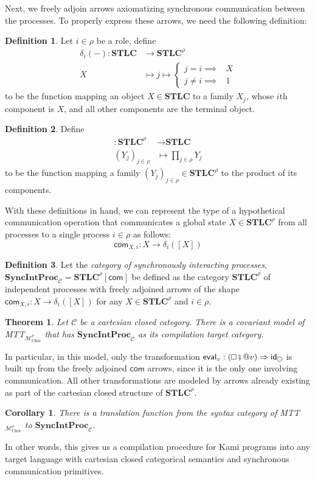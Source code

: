 \documentclass{scrartcl}
\theoremstyle{definition}
\newtheorem{definition}{Definition}
\theoremstyle{plain}
\newtheorem{theorem}{Theorem}
\newtheorem{corollary}{Corollary}
\renewcommand{\square}%
  {\tikz{\draw (0,0) rectangle (0.2cm,0.2cm);}}
\renewcommand{\circle}%
  {\tikz{\draw (0,0) circle [radius=0.1cm];}}
\begin{document}
Next, we freely adjoin arrows axiomatizing synchronous communication between
the processes. To properly express these arrows, we need the following
definition:
\begin{definition}
  Let $i\in\rho$ be a role, define
  \begin{align*}
    \delta_i({-}) : \textbf{STLC} &\to \textbf{STLC}^\rho \\
    X &\mapsto j \mapsto
    \begin{cases}
      j = i \implies &X\\
      j \neq i \implies &1
    \end{cases}
  \end{align*}
  to be the function mapping an object $X \in \textbf{STLC}$ to a family
  $X_j$, whose $i$th component is $X$, and all other components are the
  terminal object.
\end{definition}
\begin{definition} Define
  \begin{align*}
    [{-}] : \textbf{STLC}^\rho &\to \textbf{STLC} \\
    (Y_j)_{j\in\rho} &\mapsto \prod_{j \in \rho} Y_j
  \end{align*}
  to be the function mapping a family $(Y_j)_{j\in\rho} \in \textbf{STLC}^\rho$
  to the product of its components.
\end{definition}
With these definitions in hand, we can represent the type of a hypothetical
communication operation that communicates a global state $X \in
\textbf{STLC}^\rho$ from all processes to a single process $i \in \rho$ as
follows:
\[
  \textsf{com}_{X,i} : X \to \delta_i([X])
\]
\begin{definition}
  Let the \emph{category of synchronously interacting processes},
  $\textbf{SyncIntProc}_{\mathcal{C}} = \textbf{STLC}^\rho[\textsf{com}]$ be
  defined as the category $\textbf{STLC}^\rho$ of independent processes with
  freely adjoined arrows of the shape $\textsf{com}_{X,i} : X \to
  \delta_i([X])$ for any $X \in \textbf{STLC}^\rho$ and $i \in \rho$.
\end{definition}
\begin{theorem}
  Let $\mathcal{C}$ be a cartesian closed category. There is a covariant model
  of MTT${}_{\mathcal{M}^\rho_{\textrm{Chor}}}$ that has
  $\textbf{SyncIntProc}_{\mathcal{C}}$ as its compilation target category.
\end{theorem}
In particular, in this model, only the transformation $\textsf{eval}_v :
(\square \fatsemi {}@ v) \Rightarrow \textsf{id}_{\circle}$ is built up from
the freely adjoined $\textsf{com}$ arrows, since it is the only one involving
communication. All other transformations are modeled by arrows already existing
as part of the cartesian closed structure of $\textbf{STLC}^\rho$.
\begin{corollary}
  There is a translation function from the syntax category of
  MTT${}_{\mathcal{M}^\rho_{\textrm{Chor}}}$ to
  $\textbf{SyncIntProc}_{\mathcal{C}}$.
\end{corollary}
In other words, this gives us a compilation procedure for Kami programs into
any target language with cartesian closed categorical semantics and synchronous
communication primitives.
\end{document}
